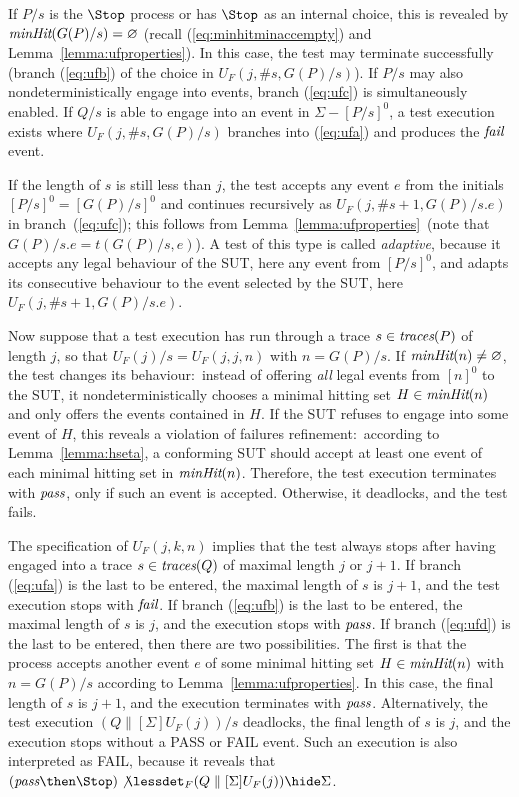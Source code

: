 If $P/s$ is the $\Stop$ process or has $\Stop$ as an internal choice, this is
revealed by $\text{\it minHit}(G(P)/s) = \varnothing$ (recall
(\ref{eq:minhitminaccempty}) and Lemma~\ref{lemma:ufproperties}). In this
case, the test may terminate successfully (branch (\ref{eq:ufb}) of the
choice in $U_F(j,\#s,G(P)/s)$). If $P/s$ may also nondeterministically engage
into events, branch (\ref{eq:ufc}) is simultaneously enabled. If $Q/s$ is
able to engage into an event in $\Sigma - [P/s]^0$, a test execution exists
where $U_F(j,\#s,G(P)/s)$ branches into (\ref{eq:ufa}) and produces the
${\text{\it fail}}$ event.

If the length of $s$ is still less than $j$, the test accepts any event $e$
from the initials $[P/s]^0 = [G(P)/s]^0$ and continues recursively as
$U_F(j,\#s+1,G(P)/s.e)$ in branch~(\ref{eq:ufc}); this follows from
Lemma~\ref{lemma:ufproperties}~(note that $G(P)/s.e = t(G(P)/s,e)$). A test
of this type is called \emph{adaptive}, because it accepts any legal
behaviour of the SUT, here any event from $[P/s]^0$, and adapts its
consecutive behaviour to the event selected by the SUT, here
$U_F(j,\#s+1,G(P)/s.e)$.

Now suppose that a test execution has run through a trace $s\in\text{\it traces}(P)$ of
length $j$, so that $U_F(j)/s = U_F(j,j,n)$ with $n = G(P)/s$. If
$\text{\it minHit}(n)\neq \varnothing$, the test changes its behaviour:~instead of
offering {\it all} legal events from $[n]^0$ to the SUT, it
nondeterministically chooses a minimal hitting set $H\in \text{\it minHit}(n)$ and
only offers the events contained in $H$. If the SUT refuses to engage into
some event of $H$, this reveals a violation of failures refinement:~according
to Lemma~\ref{lemma:hseta}, a conforming SUT should accept at least one event
of each minimal hitting set in $\text{\it minHit}(n)$. Therefore, the test execution
terminates with  ${\text{\it pass}}$, only if such an event is accepted. Otherwise, it
deadlocks, and the test fails.

The specification of $U_F(j,k,n)$ implies that the test always stops after
having engaged into a trace $s\in\text{\it traces}(Q)$ of maximal length $j$ or $j+1$. If
branch (\ref{eq:ufa}) is the last to be entered, the maximal length of $s$ is
$j+1$, and the test execution stops with ${\text{\it fail}}$. If branch (\ref{eq:ufb})
is the last to be entered, the maximal length of $s$ is $j$, and the
execution stops with ${\text{\it pass}}$. If branch (\ref{eq:ufd}) is the last to be
entered, then there are two possibilities. The first is that the process
accepts another event $e$ of some minimal hitting set $H\in\text{\it minHit}(n)$ with
$n = G(P)/s$ according to Lemma~\ref{lemma:ufproperties}. In this case, the
final length of $s$ is $j+1$, and the execution terminates with ${\text{\it pass}}$.
Alternatively, the test execution $(Q\parallel[\Sigma] U_F(j))/s$ deadlocks,
the final length of $s$ is $j$, and the execution stops without a PASS or
FAIL event. Such an execution is also interpreted as FAIL, because it reveals
that $(\epass\then\Stop) \not\lessdet_F (Q\parallel[\Sigma] U_F(j)) \hide
\Sigma$.

